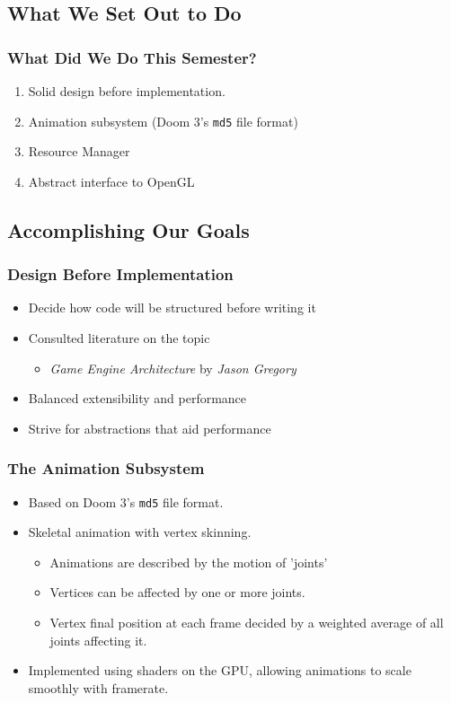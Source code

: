 \documentclass{beamer}
\begin{document}
\subsection{What We Set Out to Do}

\begin{frame}
   \frametitle{What Did We Do This Semester?}
   \begin{enumerate}
      \item Solid design before implementation.
      \item Animation subsystem (Doom 3's \texttt{md5} file format)
      \item Resource Manager
      \item Abstract interface to OpenGL
   \end{enumerate}
\end{frame}

\subsection{Accomplishing Our Goals}

\begin{frame}
   \frametitle{Design Before Implementation}
   \begin{itemize}
      \item Decide how code will be structured before writing it
      \item Consulted literature on the topic
      \begin{itemize}
         \item \emph{Game Engine Architecture} by \emph{Jason Gregory}
      \end{itemize}
      \item Balanced extensibility and performance
      \item Strive for abstractions that aid performance
   \end{itemize}
\end{frame}

\begin{frame}
   \frametitle{The Animation Subsystem}
   \begin{itemize}
      \item Based on Doom 3's \texttt{md5} file format.
      \item Skeletal animation with vertex skinning.
      \begin{itemize}
         \item Animations are described by the motion of 'joints'
         \item Vertices can be affected by one or more joints.
         \item Vertex final position at each frame decided by a weighted
         average of all joints affecting it.
      \end{itemize}
      \item Implemented using shaders on the GPU, allowing animations to scale
      smoothly with framerate.
   \end{itemize}
\end{frame}
\end{document}
